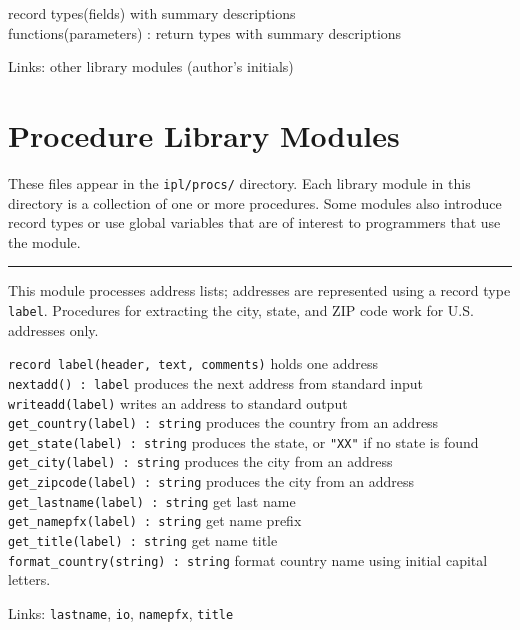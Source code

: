 record types(fields) with summary descriptions\\
functions(parameters) : return types with summary descriptions

Links: other library modules (author's initials)

\section{Procedure Library Modules}

These files appear in the \texttt{ipl/procs/} directory. Each library
module in this directory is a collection of one or more procedures.
Some modules also introduce record types or use global variables that
are of interest to programmers that use the module.

\vspace{0.25cm}\hrule{}

This module processes address lists; addresses are
represented using a record type \texttt{label}. Procedures for
extracting the city, state, and ZIP code work for U.S. addresses only.

\texttt{record label(header, text, comments)} holds one address\\
\texttt{nextadd() : label} produces the next address from standard
input\\
\texttt{writeadd(label)} writes an address to standard output\\
\texttt{get\_country(label) : string} produces the country from an
address\\
\texttt{get\_state(label) : string} produces the state,
or \texttt{"XX"} if no state is found\\
\texttt{get\_city(label) : string} produces the city from an address\\
\texttt{get\_zipcode(label) : string} produces the city from an address\\
\texttt{get\_lastname(label) : string} get last name\\
\texttt{get\_namepfx(label) : string} get name prefix\\
\texttt{get\_title(label) : string} get name title\\
\texttt{format\_country(string) : string} format country name using
initial capital letters.

Links: \texttt{lastname}, \texttt{io}, \texttt{namepfx}, \texttt{title}

